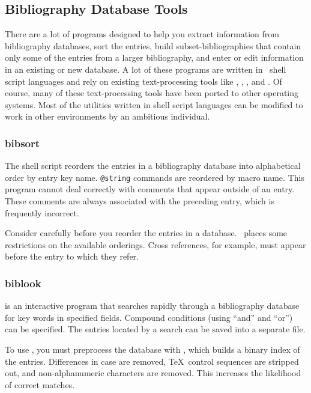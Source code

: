 \subsection{Bibliography Database Tools}

There 
are a lot of programs designed to help you extract information
from bibliography databases, sort the entries,
build subset-bibliographies that contain only some of the entries
from a larger bibliography, and enter or edit information in an existing
or new database.
A lot of these programs are written in \Unix\ shell script 
languages and
rely on existing text-processing tools like ,
, , and .  Of
course, many of these text-processing tools have been ported to other
operating systems.  Most of the utilities written in shell script
languages can be modified to work in other environments by an
ambitious individual.

\subsubsection{bibsort}

The  shell script reorders the 
entries in a bibliography
database into alphabetical order by entry key name.  \texttt{@string} commands
are reordered by macro name.
This program cannot deal correctly with
comments that appear outside of an entry.  These comments are always
associated with the preceding entry, which is frequently incorrect.

Consider carefully before you reorder the entries in a database.  \BibTeX\
places some restrictions on the available orderings.  Cross references,
for example, must appear before the entry to which they refer.

\subsubsection{biblook}

 is an interactive program that
searches rapidly through a bibliography database for key words in specified
fields.  Compound conditions (using ``and'' and ``or'') can be specified.
The entries located by a search can be saved into a separate file.

To use , you must preprocess the database
with , which builds a binary index of
the entries.  Differences in case are removed, \TeX\
control sequences are stripped out, and non-alphanumeric characters
are removed.  This increases the likelihood of correct matches.

